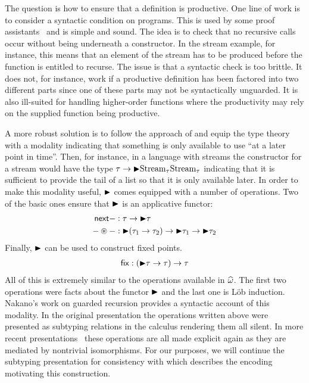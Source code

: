 The question is how to ensure that a definition is productive. One
line of work is to consider a syntactic condition on programs. This is
used by some proof assistants~\citep{coq} and is simple and
sound. The idea is to check that no recursive calls occur without
being underneath a constructor. In the stream example, for instance,
this means that an element of the stream has to be produced before the
function is entitled to recurse. The issue is that a syntactic check
is too brittle. It does not, for instance, work if a productive
definition has been factored into two different parts since one of
these parts may not be syntactically unguarded. It is also ill-suited
for handling higher-order functions where the productivity may rely on
the supplied function being productive.

A more robust solution is to follow the approach of
\citet{Nakano:00} and equip the type theory with a modality
indicating that something is only available to use ``at a later point
in time''. Then, for instance, in a language with streams the
constructor for a stream would have the type
$\tau \to {\blacktriangleright} \mathrm{Stream}_\tau{\mathrm{Stream}_\tau}$
indicating that it is sufficient to provide the tail of a list so that
it is only available later. In order to make this modality useful,
${\blacktriangleright}$ comes equipped with a number of operations. Two of the basic
ones ensure that ${\blacktriangleright}$ is an applicative functor:
\begin{align*}
  \mathsf{next}{-} &: \tau \to {\blacktriangleright} \tau\\
  - \circledast - &: {\blacktriangleright} (\tau_1 \to \tau_2) \to {\blacktriangleright} \tau_1 \to {\blacktriangleright} \tau_2
\end{align*}
Finally, ${\blacktriangleright}$ can be used to construct fixed points.
\begin{align*}
  \mathsf{fix}{} : ({\blacktriangleright} \tau \to \tau) \to \tau
\end{align*}
All of this is extremely similar to the operations available in
$\widehat{\omega}$. The first two operations were facts about the
functor ${\blacktriangleright}$ and the last one is L\"ob induction. Nakano's work on
guarded recursion provides a syntactic account of this modality. In
the original presentation the operations written above were presented
as subtyping relations in the calculus rendering them all silent. In
more recent
presentations~\citep{Birkedal:steps:11,Bizjak:16,Birkedal:16,Bahr:17}
these operations are all made explicit again as they are mediated by
nontrivial isomorphisms. For our purposes, we will continue the
subtyping presentation for consistency with \citet{Pottier:11} which
describes the encoding motivating this construction.

